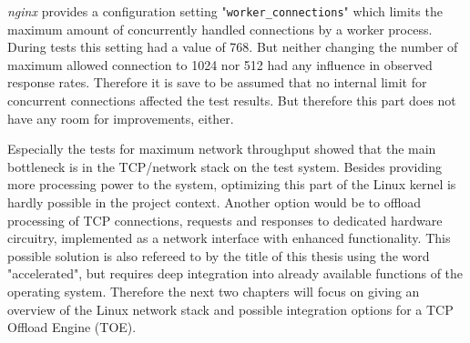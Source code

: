 \textit{nginx} provides a configuration setting "\texttt{worker\_connections}" which limits the maximum amount of concurrently handled connections by a worker process. During tests this setting had a value of 768. But neither changing the number of maximum allowed connection to 1024 nor 512 had any influence in observed response rates. Therefore it is save to be assumed that no internal limit for concurrent connections affected the test results. But therefore this part does not have any room for improvements, either.

Especially the tests for maximum network throughput showed that the main bottleneck is in the TCP/network stack on the test system. Besides providing more processing power to the system, optimizing this part of the Linux kernel is hardly possible in the project context. Another option would be to offload processing of TCP connections, requests and responses to dedicated hardware circuitry, implemented as a network interface with enhanced functionality. This possible solution is also refereed to by the title of this thesis using the word "accelerated", but requires deep integration into already available functions of the operating system. Therefore the next two chapters will focus on giving an overview of the Linux network stack and possible integration options for a TCP Offload Engine (TOE).